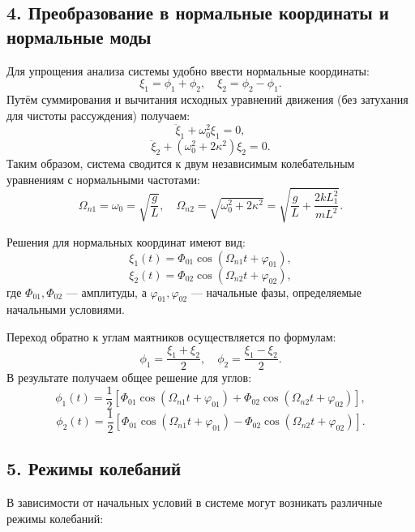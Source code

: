 \documentclass[a4paper,11pt]{article}
\theoremstyle{definition}
\begin{document}
\subsection*{4. Преобразование в нормальные координаты и нормальные моды}
Для упрощения анализа системы удобно ввести нормальные координаты:
\[
\xi_1 = \phi_1 + \phi_2, \quad \xi_2 = \phi_2 - \phi_1.
\]
Путём суммирования и вычитания исходных уравнений движения (без затухания для чистоты рассуждения) 
получаем:
\[
\ddot{\xi}_1 + \omega_0^2 \xi_1 = 0,
\]
\[
\ddot{\xi}_2 + \left(\omega_0^2 + 2\kappa^2\right) \xi_2 = 0.
\]
Таким образом, система сводится к двум независимым колебательным уравнениям с нормальными частотами:
\[
\Omega_{n1} = \omega_0 = \sqrt{\frac{g}{L}}, \quad \Omega_{n2} = \sqrt{\omega_0^2 + 2\kappa^2} = \sqrt{\frac{g}{L} + \frac{2kL_1^2}{mL^2}}.
\]

Решения для нормальных координат имеют вид:
\[
\xi_1(t) = \Phi_{01}\cos\left(\Omega_{n1}t+\varphi_{01}\right),
\]
\[
\xi_2(t) = \Phi_{02}\cos\left(\Omega_{n2}t+\varphi_{02}\right),
\]
где \(\Phi_{01}, \Phi_{02}\) --- амплитуды, а \(\varphi_{01}, \varphi_{02}\) --- начальные фазы, 
определяемые начальными условиями.

Переход обратно к углам маятников осуществляется по формулам:
\[
\phi_1 = \frac{\xi_1+\xi_2}{2}, \quad \phi_2 = \frac{\xi_1-\xi_2}{2}.
\]
В результате получаем общее решение для углов:
\[
\phi_1(t) = \frac{1}{2}\left[\Phi_{01}\cos\left(\Omega_{n1}t+\varphi_{01}\right)+\Phi_{02}\cos\left(\Omega_{n2}t+\varphi_{02}\right)\right],
\]
\[
\phi_2(t) = \frac{1}{2}\left[\Phi_{01}\cos\left(\Omega_{n1}t+\varphi_{01}\right)-\Phi_{02}\cos\left(\Omega_{n2}t+\varphi_{02}\right)\right].
\]



\subsection*{5. Режимы колебаний}
В зависимости от начальных условий в системе могут возникать различные режимы колебаний:
\end{document}
